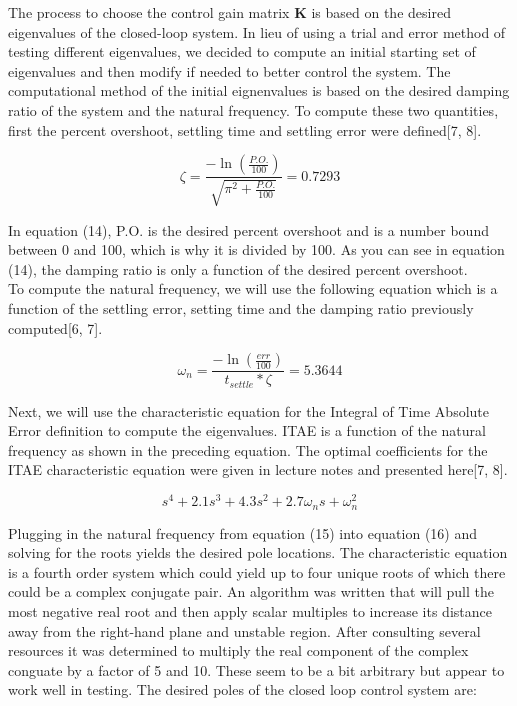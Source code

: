 \documentclass[titlepage]{article}
\begin{document}
	The process to choose the control gain matrix \textbf{K} is based on the desired eigenvalues of the closed-loop system. In lieu of using a trial and error method of testing different eigenvalues, we decided to compute an initial starting set of eigenvalues and then modify if needed to better control the system. The computational method of the initial eignenvalues is based on the desired damping ratio of the system and the natural frequency. To compute these two quantities, first the percent overshoot, settling time and settling error were defined[7, 8].


\begin{equation}
\zeta = \frac{-\ln{\left(\frac{P.O.}{100}\right)}}{\sqrt{\pi^2+ \frac{P.O.}{100}}}=0.7293
\end{equation}

In equation (14), P.O. is the desired percent overshoot and is a number bound between 0 and 100, which is why it is divided by 100. As you can see in equation (14), the damping ratio is only a function of the desired percent overshoot.\\

To compute the natural frequency, we will use the following equation which is a function of the settling error, setting time and the damping ratio previously computed[6, 7].

\begin{equation}
\omega_{n} = \frac{-\ln\left(\frac{err}{100}\right)}{t_{settle} * \zeta}=5.3644
\end{equation}

Next, we will use the characteristic equation for the Integral of Time Absolute Error definition to compute the eigenvalues. ITAE is a function of the natural frequency as shown in the preceding equation.
The optimal coefficients for the ITAE characteristic equation were given in lecture notes and presented here[7, 8].

\begin{equation}
s^{4} + 2.1s^{3} + 4.3s^{2} + 2.7\omega_{n}s + \omega_{n}^2
\end{equation}

Plugging in the natural frequency from equation (15) into equation (16) and solving for the roots yields the desired pole locations. The characteristic equation is a fourth order system which could yield up to four unique roots of which there could be a complex conjugate pair. An algorithm was written that will pull the most negative real root and then apply scalar multiples to  increase its distance away from the right-hand plane and unstable region. After consulting several resources it was determined to multiply the real component of the complex conguate by a factor of 5 and 10. These seem to be a bit arbitrary but appear to work well in testing. The desired poles of the closed loop control system are:
\end{document}
